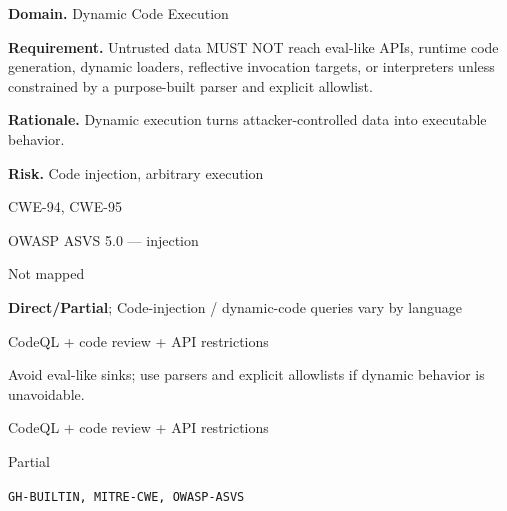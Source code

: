 \documentclass[10pt,letterpaper]{article}
\newcommand{\prioritybadge}[2]{\tcbox[on line,boxrule=0pt,arc=1.2mm,boxsep=0.7mm,left=1mm,right=1mm,top=0.4mm,bottom=0.4mm,colback=#2!12,coltext=#2]{\scriptsize\bfseries #1}}
\begin{document}
\begin{rulebox}[title={\texttt{SCS-ALL-DYN-001} \hfill \prioritybadge{Critical Control}{Critical}}]
\textbf{Domain.} Dynamic Code Execution

\textbf{Requirement.} Untrusted data MUST NOT reach eval-like APIs, runtime code generation, dynamic loaders, reflective invocation targets, or interpreters unless constrained by a purpose-built parser and explicit allowlist.

\textbf{Rationale.} Dynamic execution turns attacker-controlled data into executable behavior.

\textbf{Risk.} Code injection, arbitrary execution

\begin{description}[leftmargin=2.65cm,labelwidth=2.3cm,style=nextline,itemsep=1pt,topsep=3pt]
  \item[CWE] CWE-94, CWE-95
  \item[OWASP] OWASP ASVS 5.0 --- injection
  \item[CERT] Not mapped
  \item[CodeQL] \textbf{Direct/Partial}; Code-injection / dynamic-code queries vary by language
  \item[Enforcement] CodeQL + code review + API restrictions
  \item[Prevention] Avoid eval-like sinks; use parsers and explicit allowlists if dynamic behavior is unavoidable.
  \item[Verification] CodeQL + code review + API restrictions
  \item[Automation] Partial
  \item[Sources] \texttt{GH-BUILTIN, MITRE-CWE, OWASP-ASVS}
\end{description}
\end{rulebox}
\end{document}
